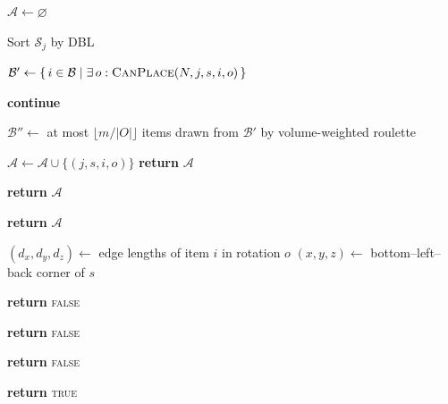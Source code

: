 \begin{algorithm}
\caption{Node expansion (\textsc{Expand})}
\label{alg:expand3d}
\small
\setlength{\baselineskip}{10pt}
\begin{algorithmic}[1]


    \State $\mathcal{A} \gets \varnothing$

     

        \State Sort $\mathcal{S}_j$ by DBL


            \State $\mathcal{B}' \gets \{\, i \in \mathcal{B} \mid
                   \exists\, o : \textsc{CanPlace}(N, j, s, i, o) \,\}$

                \State \textbf{continue} 
            \EndIf

            \State $\mathcal{B}'' \gets$ at most $\lfloor m/|O| \rfloor$ items drawn
                   from $\mathcal{B}'$ by volume-weighted roulette

                    \State $\mathcal{A} \gets \mathcal{A} \cup \{(j, s, i, o)\}$
                        \State \textbf{return} $\mathcal{A}$
                    \EndIf
                \EndIf
            \EndFor

                \State \textbf{return} $\mathcal{A}$
            \EndIf

        \EndFor

    \EndFor

    \State \textbf{return} $\mathcal{A}$

\EndProcedure

\Statex


    \State $(d_x,d_y,d_z) \gets$ edge lengths of item $i$ in rotation $o$
    \State $(x,y,z) \gets$ bottom--left--back corner of $s$

        \State \textbf{return} \textsc{false} 
    \EndIf

        \State \textbf{return} \textsc{false} 
    \EndIf

        \State \textbf{return} \textsc{false} 
    \EndIf

    \State \textbf{return} \textsc{true}

\EndProcedure
\end{algorithmic}
\end{algorithm}


